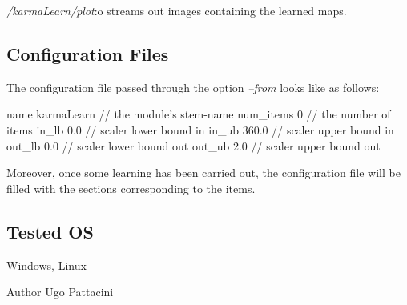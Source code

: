 {\itshape /karma\+Learn/plot}\+:o streams out images containing the learned maps.\hypertarget{group__karmaLearn_conf_file_sec}{}\subsection{Configuration Files}\label{group__karmaLearn_conf_file_sec}
The configuration file passed through the option {\itshape --from} looks like as follows\+:


\begin{DoxyCode}
[general]
name      karmaLearn    \textcolor{comment}{// the module's stem-name}
num\_items 0             \textcolor{comment}{// the number of items }
in\_lb     0.0           \textcolor{comment}{// scaler lower bound in}
in\_ub     360.0         \textcolor{comment}{// scaler upper bound in }
out\_lb    0.0           \textcolor{comment}{// scaler lower bound out}
out\_ub    2.0           \textcolor{comment}{// scaler upper bound out}
\end{DoxyCode}


Moreover, once some learning has been carried out, the configuration file will be filled with the sections corresponding to the items.\hypertarget{group__karmaToolProjection_tested_os_sec}{}\subsection{Tested O\+S}\label{group__karmaToolProjection_tested_os_sec}
Windows, Linux

\begin{DoxyAuthor}{Author}
Ugo Pattacini 
\end{DoxyAuthor}
